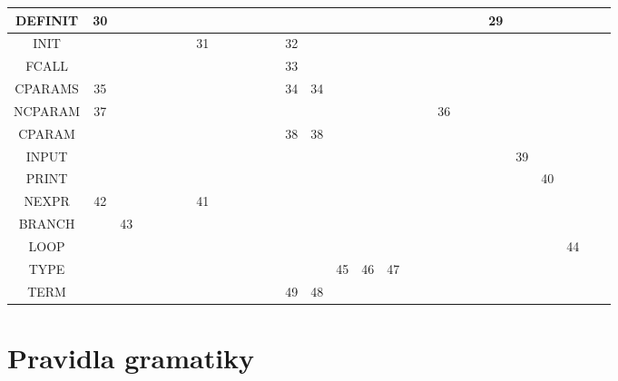 \documentclass[11pt, a4paper]{article}
\begin{document}
\begin{center}
\begin{tabular}{c | c | c | c | c | c | c | c | c | c | c | c | c | c | c | c | c | c | c | c | c | c | c | c | c | c | c | c | c }
    DEFINIT  & 30 &  &  &  &  &  &  &  &  &  &  &  &  &  &  &  &  &  &  &  &  &  & 29 &  &  &  & \\ \hline
    INIT  &  &  &  &  &  &  & 31 &  &  &  &  &  & 32 &  &  &  &  &  &  &  &  &  &  &  &  &  &  & \\ \hline
    FCALL  &  &  &  &  &  &  &  &  &  &  &  &  & 33 &  &  &  &  &  &  &  &  &  &  &  &  &  &  & \\ \hline
    CPARAMS  & 35 &  &  &  &  &  &  &  &  &  &  &  & 34 & 34 &  &  &  &  &  &  &  &  &  &  &  &  &  & \\ \hline
    NCPARAM  & 37 &  &  &  &  &  &  &  &  &  &  &  &  &  &  &  &  &  &  & 36 &  &  &  &  &  &  &  & \\ \hline
    CPARAM  &  &  &  &  &  &  &  &  &  &  &  &  & 38 & 38 &  &  &  &  &  &  &  &  &  &  &  &  &  & \\ \hline
    INPUT  &  &  &  &  &  &  &  &  &  &  &  &  &  &  &  &  &  &  &  &  &  &  &  & 39 &  &  &  & \\ \hline
    PRINT  &  &  &  &  &  &  &  &  &  &  &  &  &  &  &  &  &  &  &  &  &  &  &  &  & 40 &  &  & \\ \hline
    NEXPR  & 42 &  &  &  &  &  & 41 &  &  &  &  &  &  &  &  &  &  &  &  &  &  &  &  &  &  &  &  & \\ \hline
    BRANCH  &  & 43&  &  &  &  &  &  &  &  &  &  &  &  &  &  &  &  &  &  &  &  &  &  &  &  &  & \\ \hline
    LOOP  &  &  &  &  &  &  &  &  &  &  &  &  &  &  &  &  &  &  &  &  &  &  &  &  &  & 44 & \\ \hline
    TYPE  &  &  &  &  &  &  &  &  &  &  &  &  &  &  & 45 & 46 & 47 &  &  &  &  &  &  &  &  &  &  & \\ \hline
    TERM  &  &  &  &  &  &  &  &  &  &  &  &  & 49 & 48 &  &  &  &  &  &  &  &  &  &  &  &  &  & \\ \hline
    \end{tabular}
\end{center}

\newpage

\section{Pravidla gramatiky}
\end{document}
